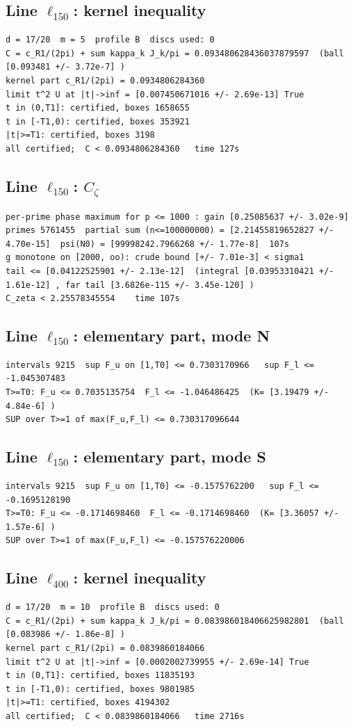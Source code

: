 \documentclass[11pt,reqno]{amsart}
\numberwithin{equation}{section}
\theoremstyle{definition}
\theoremstyle{remark}
\begin{document}
\subsection*{Line $\ell_{150}$: kernel inequality}
\begin{lstlisting}
d = 17/20  m = 5  profile B  discs used: 0
C = c_R1/(2pi) + sum kappa_k J_k/pi = 0.093480628436037879597  (ball [0.093481 +/- 3.72e-7] )
kernel part c_R1/(2pi) = 0.0934806284360
limit t^2 U at |t|->inf = [0.007450671016 +/- 2.69e-13] True
t in (0,T1]: certified, boxes 1658655
t in [-T1,0): certified, boxes 353921
|t|>=T1: certified, boxes 3198
all certified;  C < 0.0934806284360   time 127s
\end{lstlisting}
\subsection*{Line $\ell_{150}$: $C_\zeta$}
\begin{lstlisting}
per-prime phase maximum for p <= 1000 : gain [0.25085637 +/- 3.02e-9]
primes 5761455  partial sum (n<=100000000) = [2.21455819652827 +/- 4.70e-15]  psi(N0) = [99998242.7966268 +/- 1.77e-8]  107s
g monotone on [2000, oo): crude bound [+/- 7.01e-3] < sigma1
tail <= [0.04122525901 +/- 2.13e-12]  (integral [0.03953310421 +/- 1.61e-12] , far tail [3.6826e-115 +/- 3.45e-120] )
C_zeta < 2.25578345554    time 107s
\end{lstlisting}
\subsection*{Line $\ell_{150}$: elementary part, mode N}
\begin{lstlisting}
intervals 9215  sup F_u on [1,T0] <= 0.7303170966   sup F_l <= -1.045307483
T>=T0: F_u <= 0.7035135754  F_l <= -1.046486425  (K= [3.19479 +/- 4.84e-6] )
SUP over T>=1 of max(F_u,F_l) <= 0.730317096644
\end{lstlisting}
\subsection*{Line $\ell_{150}$: elementary part, mode S}
\begin{lstlisting}
intervals 9215  sup F_u on [1,T0] <= -0.1575762200   sup F_l <= -0.1695128190
T>=T0: F_u <= -0.1714698460  F_l <= -0.1714698460  (K= [3.36057 +/- 1.57e-6] )
SUP over T>=1 of max(F_u,F_l) <= -0.157576220006
\end{lstlisting}
\subsection*{Line $\ell_{400}$: kernel inequality}
\begin{lstlisting}
d = 17/20  m = 10  profile B  discs used: 0
C = c_R1/(2pi) + sum kappa_k J_k/pi = 0.083986018406625982801  (ball [0.083986 +/- 1.86e-8] )
kernel part c_R1/(2pi) = 0.0839860184066
limit t^2 U at |t|->inf = [0.0002002739955 +/- 2.69e-14] True
t in (0,T1]: certified, boxes 11835193
t in [-T1,0): certified, boxes 9801985
|t|>=T1: certified, boxes 4194302
all certified;  C < 0.0839860184066   time 2716s
\end{lstlisting}
\end{document}

